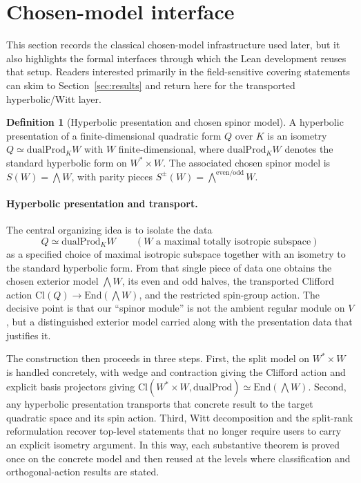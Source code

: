 \documentclass{birkjour}
\theoremstyle{plain}
\theoremstyle{definition}
\newtheorem{definition}[theorem]{Definition}
\theoremstyle{remark}
\newcommand{\Cl}{\mathrm{Cl}}
\newcommand{\End}{\mathrm{End}}
\newcommand{\dualProd}{\mathrm{dualProd}}
\begin{document}
\section{Chosen-model interface}
\label{sec:arch}

This section records the classical chosen-model infrastructure used later, but
it also highlights the formal interfaces through which the Lean development
reuses that setup. Readers interested primarily in the field-sensitive covering
statements can skim to Section~\ref{sec:results} and return here for the
transported hyperbolic/Witt layer.

\begin{definition}[Hyperbolic presentation and chosen spinor model]
A hyperbolic presentation of a finite-dimensional quadratic form $Q$ over $K$
is an isometry $Q \simeq \dualProd_K W$ with $W$ finite-dimensional, where
$\dualProd_K W$ denotes the standard hyperbolic form on $W^* \times W$. The
associated chosen spinor model is $S(W)=\bigwedge W$, with parity pieces
$S^\pm(W)=\bigwedge^{\mathrm{even}/\mathrm{odd}} W$.
\end{definition}

\paragraph{Hyperbolic presentation and transport.} The central organizing idea is
to isolate the data
\[
  Q \simeq \dualProd_K W
  \qquad (W \text{ a maximal totally isotropic subspace})
\]
as a specified choice of maximal isotropic subspace together with an isometry to
the standard hyperbolic form. From that single piece of data one obtains the
chosen exterior model $\bigwedge W$, its even and odd halves, the transported
Clifford action $\Cl(Q)\to\End(\bigwedge W)$, and the restricted spin-group
action. The decisive point is that our ``spinor module'' is not the
ambient regular module on $V$, but a distinguished exterior model carried along
with the presentation data that justifies it.

The construction then proceeds in three steps. First, the split model on
$W^* \times W$ is handled concretely, with wedge and contraction giving the
Clifford action and explicit basis projectors giving
$\Cl(W^* \times W,\dualProd)\simeq\End(\bigwedge W)$. Second, any hyperbolic
presentation transports that concrete result to the target quadratic space and
its spin action. Third, Witt decomposition and the split-rank reformulation recover
top-level statements that no longer require users to carry an explicit isometry
argument. In this way, each substantive theorem is proved once on the concrete
model and then reused at the levels where classification and orthogonal-action
results are stated.
\end{document}
